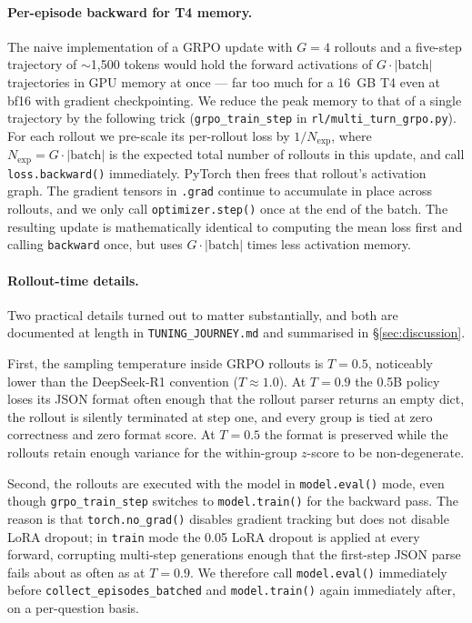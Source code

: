 \documentclass[11pt]{article}
\begin{document}
\paragraph{Per-episode backward for T4 memory.}
The naive implementation of a GRPO update with $G=4$ rollouts and a
five-step trajectory of $\sim$1{,}500 tokens would hold the forward
activations of $G \cdot |\text{batch}|$ trajectories in GPU memory at
once --- far too much for a 16~GB T4 even at bf16 with gradient
checkpointing. We reduce the peak memory to that of a single trajectory
by the following trick (\texttt{grpo\_train\_step} in
\texttt{rl/multi\_turn\_grpo.py}). For each rollout we pre-scale its
per-rollout loss by $1/N_{\mathrm{exp}}$, where $N_{\mathrm{exp}} = G\cdot|\text{batch}|$ is the
expected total number of rollouts in this update, and call
\texttt{loss.backward()} immediately. PyTorch then frees that rollout's
activation graph. The gradient tensors in \texttt{.grad} continue to
accumulate in place across rollouts, and we only call
\texttt{optimizer.step()} once at the end of the batch. The resulting
update is mathematically identical to computing the mean loss first and
calling \texttt{backward} once, but uses $G \cdot |\text{batch}|$ times
less activation memory.

\paragraph{Rollout-time details.}
\label{sec:grpo-rollout-details}
Two practical details turned out to matter substantially, and both are
documented at length in \texttt{TUNING\_JOURNEY.md} and summarised in
§\ref{sec:discussion}.

First, the sampling temperature inside GRPO rollouts is $T=0.5$,
noticeably lower than the DeepSeek-R1 convention ($T \approx 1.0$). At
$T=0.9$ the 0.5B policy loses its JSON format often enough that the
rollout parser returns an empty dict, the rollout is silently
terminated at step one, and every group is tied at zero correctness
and zero format score. At $T=0.5$ the format is preserved while the
rollouts retain enough variance for the within-group $z$-score to be
non-degenerate.

Second, the rollouts are executed with the model in
\texttt{model.eval()} mode, even though \texttt{grpo\_train\_step}
switches to \texttt{model.train()} for the backward pass. The reason
is that \texttt{torch.no\_grad()} disables gradient tracking but does
not disable LoRA dropout; in \texttt{train} mode the 0.05 LoRA dropout
is applied at every forward, corrupting multi-step generations enough
that the first-step JSON parse fails about as often as at $T=0.9$. We
therefore call \texttt{model.eval()} immediately before
\texttt{collect\_episodes\_batched} and \texttt{model.train()} again
immediately after, on a per-question basis.
\end{document}
